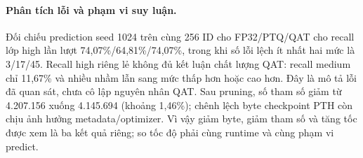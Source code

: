 \paragraph{Phân tích lỗi và phạm vi suy luận.} Đối chiếu prediction seed 1024 trên cùng 256 ID cho FP32/PTQ/QAT cho recall lớp high lần lượt 74,07\%/64,81\%/74,07\%, trong khi số lỗi lệch ít nhất hai mức là 3/17/45. Recall high riêng lẻ không đủ kết luận chất lượng QAT: recall medium chỉ 11,67\% và nhiều nhầm lẫn sang mức thấp hơn hoặc cao hơn. Đây là mô tả lỗi đã quan sát, chưa cô lập nguyên nhân QAT. Sau pruning, số tham số giảm từ 4.207.156 xuống 4.145.694 (khoảng 1,46\%); chênh lệch byte checkpoint PTH còn chịu ảnh hưởng metadata/optimizer. Vì vậy giảm byte, giảm tham số và tăng tốc được xem là ba kết quả riêng; so tốc độ phải cùng runtime và cùng phạm vi predict.
